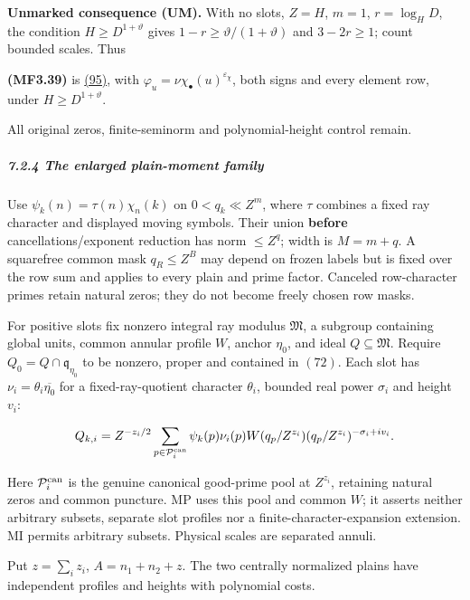 \textbf{Unmarked consequence (UM).} With no slots, \(Z=H\), \(m=1\), \(r=\log_HD\), the condition \(H\ge D^{1+\vartheta}\) gives \(1-r\ge\vartheta/(1+\vartheta)\) and \(3-2r\ge1\); count bounded scales. Thus

\hypertarget{mf:eq:B3.39}{}

\label{mf:eq:B3.39}

\textbf{(MF3.39)} is \protect\hyperlink{cf:eq:3.2}{(95)}, with \(\varphi_u=\nu\chi_\bullet(u)^{\varepsilon_\chi}\), both signs and every element row, under \(H\ge D^{1+\vartheta}\).

All original zeros, finite-seminorm and polynomial-height control remain.

\hypertarget{the-enlarged-plain-moment-family}{}

\label{the-enlarged-plain-moment-family}

\hypertarget{the-enlarged-plain-moment-family-heading-2}{%
\subparagraph{7.2.4 The enlarged plain-moment family}}

Use \(\psi_k(n)=\tau(n)\chi_n(k)\) on \(0<q_k\ll Z^m\), where \(\tau\) combines a fixed ray character and displayed moving symbols. Their union \textbf{before} cancellations/exponent reduction has norm \(\le Z^q\); width is \(M=m+q\). A squarefree common mask \(q_R\le Z^B\) may depend on frozen labels but is fixed over the row sum and applies to every plain and prime factor. Canceled row-character primes retain natural zeros; they do not become freely chosen row masks.

For positive slots fix nonzero integral ray modulus \(\mathfrak M\), a subgroup containing global units, common annular profile \(W\), anchor \(\eta_0\), and ideal \(Q\subseteq\mathfrak M\). Require \(Q_0=Q\cap\mathfrak q_{\eta_0}\) to be nonzero, proper and contained in \((72)\). Each slot has \(\nu_i=\theta_i\overline{\eta_0}\) for a fixed-ray-quotient character \(\theta_i\), bounded real power \(\sigma_i\) and height \(v_i\):

\[
Q_{k,i}=Z^{-z_i/2}\sum_{p\in\mathcal P_i^{\rm can}}
 \psi_k(p)\nu_i(p)W(q_p/Z^{z_i})
 (q_p/Z^{z_i})^{-\sigma_i+iv_i}.
\]

Here \(\mathcal P_i^{\rm can}\) is the genuine canonical good-prime pool at \(Z^{z_i}\), retaining natural zeros and common puncture. MP uses this pool and common \(W\); it asserts neither arbitrary subsets, separate slot profiles nor a finite-character-expansion extension. MI permits arbitrary subsets. Physical scales are separated annuli.

Put \(z=\sum_i z_i\), \(A=n_1+n_2+z\). The two centrally normalized plains have independent profiles and heights with polynomial costs.

